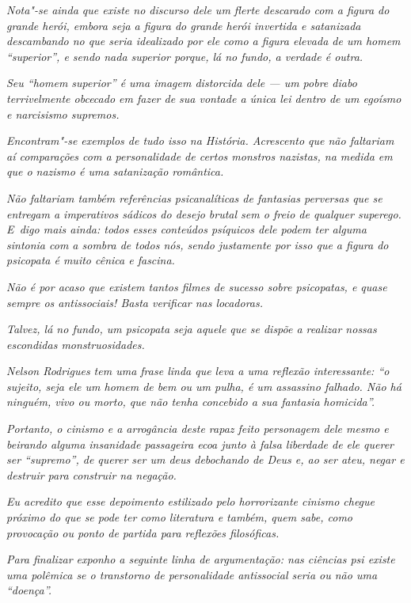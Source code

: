 \emph{Nota"-se ainda que existe no discurso dele um flerte descarado com
a figura do grande herói, embora seja a figura do grande herói invertida
e satanizada descambando no que seria idealizado por ele como a figura
elevada de um homem ``superior'', e sendo nada superior porque, lá no
fundo, a verdade é outra.}~

\emph{Seu ``homem superior'' é uma imagem distorcida dele --- um pobre
diabo terrivelmente obcecado em fazer de sua vontade a única lei dentro
de um egoísmo e narcisismo supremos.}~

\emph{Encontram"-se exemplos de tudo isso na História. Acrescento que não
faltariam aí comparações com a personalidade de certos monstros
nazistas, na medida em que o nazismo é uma satanização romântica.}~

\emph{Não faltariam também referências psicanalíticas de fantasias
perversas que se entregam a imperativos sádicos do desejo brutal sem o
freio de qualquer superego. E~digo mais ainda: todos esses conteúdos
psíquicos dele podem ter alguma sintonia com a sombra de todos nós,
sendo justamente por isso que a figura do psicopata é muito cênica e
fascina.}~

\emph{Não é por acaso que existem tantos filmes de sucesso sobre
psicopatas, e quase sempre os antissociais! Basta verificar nas
locadoras.}~

\emph{Talvez, lá no fundo, um psicopata seja aquele que se dispõe a
realizar nossas escondidas monstruosidades.}~

\emph{Nelson Rodrigues tem uma frase linda que leva a uma reflexão
interessante: ``o sujeito, seja ele um homem de bem ou um pulha, é um
assassino falhado. Não há ninguém, vivo ou morto, que não tenha
concebido a sua fantasia homicida''.}~

\emph{Portanto, o cinismo e a arrogância deste rapaz feito personagem
dele mesmo e beirando alguma insanidade passageira ecoa junto à falsa
liberdade de ele querer ser ``supremo'', de querer ser um deus
debochando de Deus e, ao ser ateu, negar e destruir para construir na
negação.}~

\emph{Eu acredito que esse depoimento estilizado pelo horrorizante
cinismo chegue próximo do que se pode ter como literatura e também, quem
sabe, como provocação ou ponto de partida para reflexões filosóficas.}~

\emph{Para finalizar exponho a seguinte linha de argumentação: nas
ciências psi existe uma polêmica se o transtorno de personalidade
antissocial seria ou não uma ``doença''.}~

